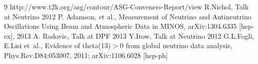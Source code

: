\begin{thebibliography}{9}
  http://www.t2k.org/asg/contour/ASG-Conveners-Report/view
%
%
  R.Nichol,
  Talk at Neutrino 2012
  P. Adamson, et al.,
  Measurement of Neutrino and Antineutrino Oscillations Using Beam and Atmospheric Data in MINOS,
  arXiv:1304.6335 [hep-ex], 2013
  A. Radovic,
  Talk at DPF 2013
  Y.Itow,
  Talk at Neutrino 2012
%
%
%
%
  G.L.Fogli, E.Lisi et~al.,
  Evidence of theta(13)$>$0 from global neutrino data analysis,
  Phys.Rev.D84:053007, 2011; arXiv:1106.6028 [hep-ph]
%
%
%
%

\end{thebibliography}


